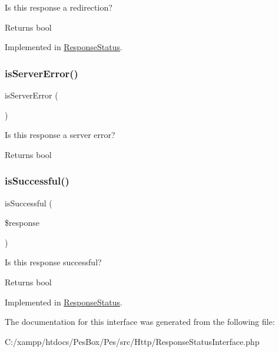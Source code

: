 Is this response a redirection?

\begin{DoxyReturn}{Returns}
bool 
\end{DoxyReturn}


Implemented in \mbox{\hyperlink{class_pes_1_1_http_1_1_response_status_a5b211efda150fe422f2ae707392168d6}{Response\+Status}}.

\mbox{\label{interface_pes_1_1_http_1_1_response_status_interface_af7068240b4b7b8206a5586a01d5c4c5c}} 
\subsubsection{\texorpdfstring{is\+Server\+Error()}{isServerError()}}
{\footnotesize\ttfamily is\+Server\+Error (\begin{DoxyParamCaption}{ }\end{DoxyParamCaption})}

Is this response a server error?

\begin{DoxyReturn}{Returns}
bool 
\end{DoxyReturn}
\mbox{\label{interface_pes_1_1_http_1_1_response_status_interface_ac9309d8cf733cca95b953596caeb3969}} 
\subsubsection{\texorpdfstring{is\+Successful()}{isSuccessful()}}
{\footnotesize\ttfamily is\+Successful (\begin{DoxyParamCaption}\item[{Response\+Interface}]{\$response }\end{DoxyParamCaption})}

Is this response successful?

\begin{DoxyReturn}{Returns}
bool 
\end{DoxyReturn}


Implemented in \mbox{\hyperlink{class_pes_1_1_http_1_1_response_status_ac9309d8cf733cca95b953596caeb3969}{Response\+Status}}.



The documentation for this interface was generated from the following file\+:\begin{DoxyCompactItemize}
\item 
C\+:/xampp/htdocs/\+Pes\+Box/\+Pes/src/\+Http/Response\+Status\+Interface.\+php\end{DoxyCompactItemize}
